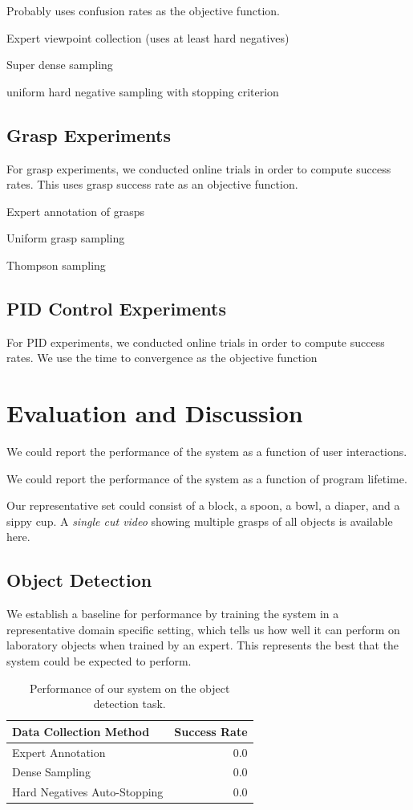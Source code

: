 \documentclass[conference]{IEEEtran}
\begin{document}
Probably uses confusion rates as the objective function.

Expert viewpoint collection (uses at least hard negatives)

Super dense sampling

uniform hard negative sampling with stopping criterion

\subsection{Grasp Experiments}
For grasp experiments, we conducted online trials in order to compute success rates.
This uses grasp success rate as an objective function.

Expert annotation of grasps

Uniform grasp sampling

Thompson sampling

\subsection{PID Control Experiments}
For PID experiments, we conducted online trials in order to compute success rates.
We use the time to convergence as the objective function




\section{Evaluation and Discussion}
We could report the performance of the system as a function of user interactions.

We could report the performance of the system as a function of program lifetime.

Our representative set could consist of a block, a spoon,
a bowl, a diaper, and a sippy cup. A \emph{single cut video} showing multiple grasps
of all objects is available here.

\subsection{Object Detection}
We establish a baseline for performance by training the system in a representative domain
specific setting, which tells us how well it can perform on laboratory objects when trained by an 
expert. This represents the best that the system could be expected to perform.

\begin{table}
  \begin{center}
  \caption{Performance of our system on the object detection task.}
  \begin{tabular}{lr}
    \toprule
  Data Collection Method & Success Rate \\ 
  \midrule
  Expert Annotation & 0.0 \\ 
  Dense Sampling & 0.0 \\ 
  Hard Negatives Auto-Stopping & 0.0 \\ 
  \bottomrule
  \end{tabular}
  \end{center}
\end{table}
\end{document}
